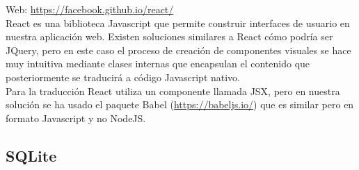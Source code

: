 
Web: \url{https://facebook.github.io/react/}\\

React es una biblioteca Javascript que permite construir interfaces de usuario en nuestra aplicación web. Existen soluciones similares a React cómo podría ser JQuery, pero en este caso el proceso de creación de componentes visuales se hace muy intuitiva mediante clases internas que encapsulan el contenido que posteriormente se traducirá a código Javascript nativo.\\

Para la traducción React utiliza un componente llamada JSX, pero en nuestra solución se ha usado el paquete Babel (\url{https://babeljs.io/}) que es similar pero en formato Javascript y no NodeJS.\\

\subsection{SQLite}


